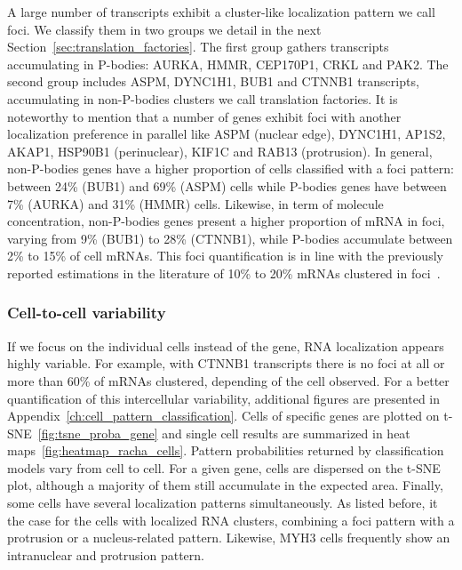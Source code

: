 A large number of transcripts exhibit a cluster-like localization pattern we call foci.
We classify them in two groups we detail in the next Section~\ref{sec:translation_factories}.
The first group gathers transcripts accumulating in \ac{P-bodies}: AURKA, HMMR, CEP170P1, CRKL and PAK2.
The second group includes ASPM, DYNC1H1, BUB1 and CTNNB1 transcripts, accumulating in non-\ac{P-bodies} clusters we call translation factories.
It is noteworthy to mention that a number of genes exhibit foci with another localization preference in parallel like ASPM (nuclear edge), DYNC1H1, AP1S2, AKAP1, HSP90B1 (perinuclear), KIF1C and RAB13 (protrusion).
In general, non-\ac{P-bodies} genes have a higher proportion of cells classified with a foci pattern: between 24\% (BUB1) and 69\% (ASPM) cells while \ac{P-bodies} genes have between 7\% (AURKA) and 31\% (HMMR) cells.
Likewise, in term of molecule concentration, non-\ac{P-bodies} genes present a higher proportion of \ac{mRNA} in foci, varying from 9\% (BUB1) to 28\% (CTNNB1), while \ac{P-bodies} accumulate between 2\% to 15\% of cell \ac{mRNA}s.
This foci quantification is in line with the previously reported estimations in the literature of 10\% to 20\% \ac{mRNA}s clustered in foci~\cite{Pillai_2005, Hubstenberger_2017}.

\subsubsection{Cell-to-cell variability}

If we focus on the individual cells instead of the gene, \ac{RNA} localization appears highly variable.
For example, with CTNNB1 transcripts there is no foci at all or more than 60\% of \ac{mRNA}s clustered, depending of the cell observed.
For a better quantification of this intercellular variability, additional figures are presented in Appendix~\ref{ch:cell_pattern_classification}.
Cells of specific genes are plotted on \ac{t-SNE}~\ref{fig:tsne_proba_gene} and single cell results are summarized in heat maps~\ref{fig:heatmap_racha_cells}.
Pattern probabilities returned by classification models vary from cell to cell.
For a given gene, cells are dispersed on the \ac{t-SNE} plot, although a majority of them still accumulate in the expected area.
Finally, some cells have several localization patterns simultaneously.
As listed before, it the case for the cells with localized \ac{RNA} clusters, combining a foci pattern with a protrusion or a nucleus-related pattern.
Likewise, MYH3 cells frequently show an intranuclear and protrusion pattern.

